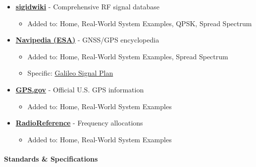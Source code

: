 \begin{itemize}
\tightlist
\item
  \textbf{\href{https://www.sigidwiki.com/wiki/Signal_Identification_Guide}{sigidwiki}}
  - Comprehensive RF signal database

  \begin{itemize}
  \tightlist
  \item
    Added to: Home, Real-World System Examples, QPSK, Spread Spectrum
  \end{itemize}
\item
  \textbf{\href{https://gssc.esa.int/navipedia/}{Navipedia (ESA)}} -
  GNSS/GPS encyclopedia

  \begin{itemize}
  \tightlist
  \item
    Added to: Home, Real-World System Examples, Spread Spectrum
  \item
    Specific:
    \href{https://gssc.esa.int/navipedia/index.php?title=GALILEO_Signal_Plan}{Galileo
    Signal Plan}
  \end{itemize}
\item
  \textbf{\href{https://www.gps.gov/}{GPS.gov}} - Official U.S. GPS
  information

  \begin{itemize}
  \tightlist
  \item
    Added to: Home, Real-World System Examples
  \end{itemize}
\item
  \textbf{\href{https://www.radioreference.com/}{RadioReference}} -
  Frequency allocations

  \begin{itemize}
  \tightlist
  \item
    Added to: Home, Real-World System Examples
  \end{itemize}
\end{itemize}

\paragraph{Standards \& Specifications}\label{standards-specifications}

